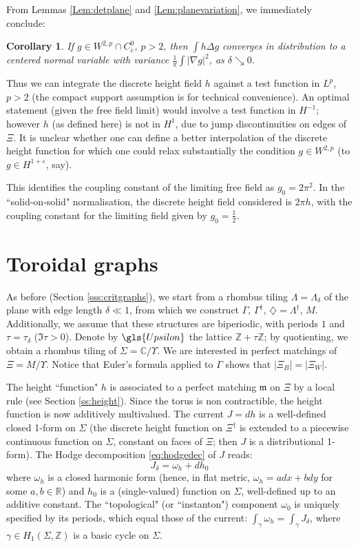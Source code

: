 \documentclass[10pt]{article}
\newcommand{\Z}{\mathbb{Z}}
\newcommand{\R}{\mathbb{R}}
\newcommand{\C}{\mathbb{C}}
\newcommand{\mf}{\mathfrak}
\newcommand{\eps}{\varepsilon}
\newcommand{\dg}{\dagger}
\newcommand{\dmd}{\diamondsuit}
\newcommand{\Lap}{\Delta\!}
\newtheorem{Cor}[thm]{Corollary}
\begin{document}
From Lemmas \ref{Lem:detplane} and \ref{Lem:planevariation}, we immediately conclude:

\begin{Cor}\label{Cor:FFplane}
If $g\in W^{2,p}\cap C^0_c$, $p>2$, then $\int h\Lap g$ converges in distribution to a centered normal variable with variance $\frac 1\pi\int |\nabla g|^2$, as $\delta\searrow 0$.
\end{Cor}

Thus we can integrate the discrete height field $h$ against a test function in $L^p$, $p>2$ (the compact support assumption is for technical convenience). An optimal statement (given the free field limit) would involve a test function in $H^{-1}$; however $h$ (as defined here) is not in $H^1$, due to jump discontinuities on edges of $\Xi$. It is unclear whether one can define a better interpolation of the discrete height function for which one could relax substantially the condition $g\in W^{2,p}$ (to $g\in H^{1+\eps}$, say). 

This identifies the coupling constant of the limiting free field as $g_0=2\pi^2$. In the ``solid-on-solid" normalisation, the discrete height field considered is $2\pi h$, with the coupling constant for the limiting field given by $g_0=\frac 12$.



\section{Toroidal graphs}\label{sec:torus}


As before (Section \ref{sss:critgraphs}), we start from a rhombus tiling $\Lambda=\Lambda_\delta$ of the plane with edge length $\delta\ll1$, from which we construct $\Gamma$, $\Gamma^\dg$, $\dmd=\Lambda^\dg$, $M$. Additionally, we assume that these structures are biperiodic, with periods $1$ and $\tau=\tau_\delta$ ($\Im\tau>0$). Denote by $\gls{Upsilon}$ the lattice $\Z+\tau\Z$; by quotienting, we obtain a rhombus tiling of $\Sigma=\C/\Upsilon$. We are interested in perfect matchings of $\Xi=M/\Upsilon$.
Notice that Euler's formula applied to $\Gamma$ shows that $|\Xi_B|=|\Xi_W|$.


The height ``function" $h$ is associated to a perfect matching ${\mf m}$ on $\Xi$ by a local rule (see Section \ref{ss:height}). Since the torus is non contractible, the height function is now additively multivalued. The current $J=dh$ is a well-defined closed 1-form on $\Sigma$ (the discrete height function on $\Xi^\dg$ is extended to a piecewise continuous function on $\Sigma$, constant on faces of $\Xi$; then $J$ is a distributional 1-form). The Hodge decomposition \eqref{eq:hodgedec} of $J$ reads:
\begin{equation}\label{eq:hodgedecdimer}
J_\delta=\omega_h+dh_0
\end{equation}
where $\omega_h$ is a closed harmonic form (hence, in flat metric, $\omega_h=adx+bdy$ for some $a,b\in\R$) and $h_0$ is a (single-valued) function on $\Sigma$, well-defined up to an additive constant. The ``topological" (or ``instanton") component $\omega_0$ is uniquely specified by its periods, which equal those of the current: $\int_\gamma\omega_h=\int_\gamma J_\delta$, where $\gamma\in H_1(\Sigma,\Z)$ is a basic cycle on $\Sigma$.
\end{document}
